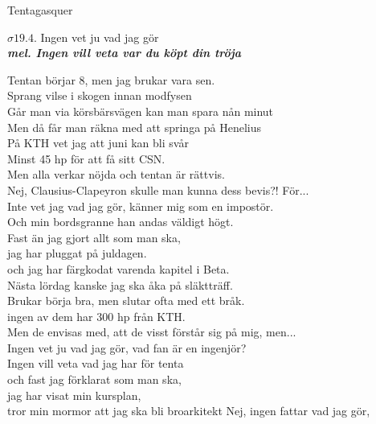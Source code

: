 \documentclass[a6paper,10pt]{article}
\newcommand{\mel}[1]{\small\textbf{\textit{mel. #1 \\}}}
\begin{document}
\begin{center}
\LARGE Tentagasquer \\
\end{center}
\begin{center}
\Large $\sigma19.4$. Ingen vet ju vad jag gör\\ 
\mel{Ingen vill veta var du köpt din tröja}
\end{center} \small Tentan börjar 8, men jag brukar vara sen.\\
Sprang vilse i skogen innan modfysen\\
Går man via körsbärsvägen kan man spara nån minut\\
Men då får man räkna med att springa på Henelius   
\vspace{5pt} \\
På KTH vet jag att juni kan bli svår\\
Minst 45 hp för att få sitt CSN.\\ 
Men alla verkar nöjda och tentan är rättvis. \\ 
Nej, Clausius-Clapeyron skulle man kunna dess bevis?! För...
\vspace{5pt}\\
Inte vet jag vad jag gör, känner mig som en impostör.\\
Och min bordsgranne han andas väldigt högt.\\
Fast än jag gjort allt som man ska,\\
jag har pluggat på juldagen.\\
och jag har färgkodat varenda kapitel i Beta.
\vspace{5pt}\\
Nästa lördag kanske jag ska åka på släktträff.\\ 
Brukar börja bra, men slutar ofta med ett bråk.\\   
ingen av dem har 300 hp från KTH.\\         
Men de envisas med, att de visst förstår sig på mig, men...
\vspace{5pt}\\
Ingen vet ju vad jag gör, vad fan är en ingenjör?\\   
Ingen vill veta vad jag har för tenta\\
och fast jag förklarat som man ska,\\
jag har visat min kursplan,\\
tror min mormor att jag ska bli broarkitekt
\newpage
\setlength{\oddsidemargin}{-0.37in}
\noindent
Nej, ingen fattar vad jag gör,\\
\end{document}
